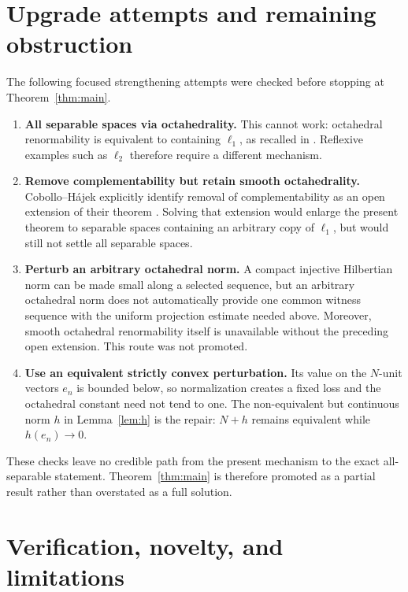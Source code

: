 \documentclass[11pt]{article}
\begin{document}
\section{Upgrade attempts and remaining obstruction}

The following focused strengthening attempts were checked before stopping at
Theorem~\ref{thm:main}.

\begin{enumerate}
\item \textbf{All separable spaces via octahedrality.}  This cannot work:
octahedral renormability is equivalent to containing $\ell_1$, as recalled in
\cite{CH}.  Reflexive examples such as $\ell_2$ therefore require a different
mechanism.

\item \textbf{Remove complementability but retain smooth octahedrality.}
Cobollo--H\'ajek explicitly identify removal of complementability as an open
extension of their theorem \cite[p.~2]{CH}.  Solving that extension would
enlarge the present theorem to separable spaces containing an arbitrary copy
of $\ell_1$, but would still not settle all separable spaces.

\item \textbf{Perturb an arbitrary octahedral norm.}  A compact injective
Hilbertian norm can be made small along a selected sequence, but an arbitrary
octahedral norm does not automatically provide one common witness sequence
with the uniform projection estimate needed above.  Moreover, smooth
octahedral renormability itself is unavailable without the preceding open
extension.  This route was not promoted.

\item \textbf{Use an equivalent strictly convex perturbation.}  Its value on
the $N$-unit vectors $e_n$ is bounded below, so normalization creates a fixed
loss and the octahedral constant need not tend to one.  The non-equivalent but
continuous norm $h$ in Lemma~\ref{lem:h} is the repair: $N+h$ remains
equivalent while $h(e_n)\to0$.
\end{enumerate}

These checks leave no credible path from the present mechanism to the exact
all-separable statement.  Theorem~\ref{thm:main} is therefore promoted as a
partial result rather than overstated as a full solution.

\section{Verification, novelty, and limitations}
\end{document}
